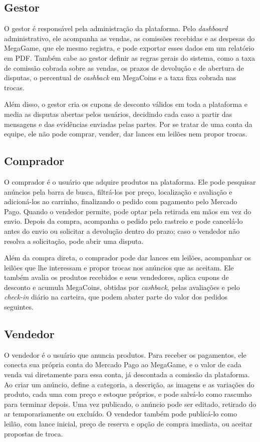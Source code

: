 \documentclass[
  12pt,
  a4paper,
  oneside,
  chapter=TITLE,
  subsection=TITLE,
  sumario=abnt-6027-2012,
  english,
  brazil
]{abntex2}
\begin{document}
\subsection{Gestor}

O gestor é responsável pela administração da plataforma. Pelo
\emph{dashboard} administrativo, ele acompanha as vendas, as comissões
recebidas e as despesas do MegaGame, que ele mesmo registra, e pode
exportar esses dados em um relatório em PDF. Também cabe ao gestor
definir as regras gerais do sistema, como a taxa de comissão cobrada
sobre as vendas, os prazos de devolução e de abertura de disputas, o
percentual de \emph{cashback} em MegaCoins e a taxa fixa cobrada nas
trocas.

Além disso, o gestor cria os cupons de desconto válidos em toda a
plataforma e media as disputas abertas pelos usuários, decidindo cada
caso a partir das mensagens e das evidências enviadas pelas partes. Por
se tratar de uma conta da equipe, ele não pode comprar, vender, dar
lances em leilões nem propor trocas.

\subsection{Comprador}

O comprador é o usuário que adquire produtos na plataforma. Ele pode
pesquisar anúncios pela barra de busca, filtrá-los por preço,
localização e avaliação e adicioná-los ao carrinho, finalizando o pedido
com pagamento pelo Mercado Pago. Quando o vendedor permite, pode optar
pela retirada em mãos em vez do envio. Depois da compra, acompanha o
pedido pelo rastreio e pode cancelá-lo antes do envio ou solicitar a
devolução dentro do prazo; caso o vendedor não resolva a solicitação,
pode abrir uma disputa.

Além da compra direta, o comprador pode dar lances em leilões,
acompanhar os leilões que lhe interessam e propor trocas nos anúncios
que as aceitam. Ele também avalia os produtos recebidos e seus
vendedores, aplica cupons de desconto e acumula MegaCoins, obtidas por
\emph{cashback}, pelas avaliações e pelo \emph{check-in} diário na
carteira, que podem abater parte do valor dos pedidos seguintes.

\subsection{Vendedor}

O vendedor é o usuário que anuncia produtos. Para receber os pagamentos,
ele conecta sua própria conta do Mercado Pago ao MegaGame, e o valor de
cada venda vai diretamente para essa conta, já descontada a comissão da
plataforma. Ao criar um anúncio, define a categoria, a descrição, as
imagens e as variações do produto, cada uma com preço e estoque
próprios, e pode salvá-lo como rascunho para terminar depois. Uma vez
publicado, o anúncio pode ser editado, retirado do ar temporariamente ou
excluído. O vendedor também pode publicá-lo como leilão, com lance
inicial, preço de reserva e opção de compra imediata, ou aceitar
propostas de troca.
\end{document}
